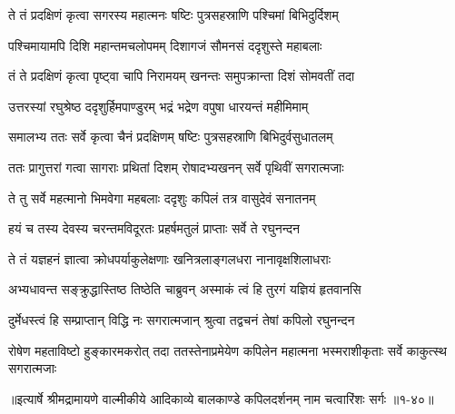 \twolineshloka
{ते तं प्रदक्षिणं कृत्वा सगरस्य महात्मनः}
{षष्टिः पुत्रसहस्राणि पश्चिमां बिभिदुर्दिशम्} %

\twolineshloka
{पश्चिमायामपि दिशि महान्तमचलोपमम्}
{दिशागजं सौमनसं ददृशुस्ते महाबलाः} %

\twolineshloka
{तं ते प्रदक्षिणं कृत्वा पृष्ट्वा चापि निरामयम्}
{खनन्तः समुपक्रान्ता दिशं सोमवतीं तदा} %

\twolineshloka
{उत्तरस्यां रघुश्रेष्ठ ददृशुर्हिमपाण्डुरम्}
{भद्रं भद्रेण वपुषा धारयन्तं महीमिमाम्} %

\twolineshloka
{समालभ्य ततः सर्वे कृत्वा चैनं प्रदक्षिणम्}
{षष्टिः पुत्रसहस्राणि बिभिदुर्वसुधातलम्} %

\twolineshloka
{ततः प्रागुत्तरां गत्वा सागराः प्रथितां दिशम्}
{रोषादभ्यखनन् सर्वे पृथिवीं सगरात्मजाः} %

\twolineshloka
{ते तु सर्वे महत्मानो भिमवेगा महबलाः}
{ददृशुः कपिलं तत्र वासुदेवं सनातनम्} %

\twolineshloka
{हयं च तस्य देवस्य चरन्तमविदूरतः}
{प्रहर्षमतुलं प्राप्ताः सर्वे ते रघुनन्दन} %

\twolineshloka
{ते तं यज्ञहनं ज्ञात्वा क्रोधपर्याकुलेक्षणाः}
{खनित्रलाङ्गलधरा नानावृक्षशिलाधराः} %

\twolineshloka
{अभ्यधावन्त सङ्क्रुद्धास्तिष्ठ तिष्ठेति चाब्रुवन्}
{अस्माकं त्वं हि तुरगं यज्ञियं हृतवानसि} %

\twolineshloka
{दुर्मेधस्त्वं हि सम्प्राप्तान् विद्धि नः सगरात्मजान्}
{श्रुत्वा तद्वचनं तेषां कपिलो रघुनन्दन} %

\threelineshloka
{रोषेण महताविष्टो हुङ्कारमकरोत् तदा}
{ततस्तेनाप्रमेयेण कपिलेन महात्मना}
{भस्मराशीकृताः सर्वे काकुत्स्थ सगरात्मजाः} %


॥इत्यार्षे श्रीमद्रामायणे वाल्मीकीये आदिकाव्ये बालकाण्डे कपिलदर्शनम् नाम चत्वारिंशः सर्गः ॥१-४०॥
